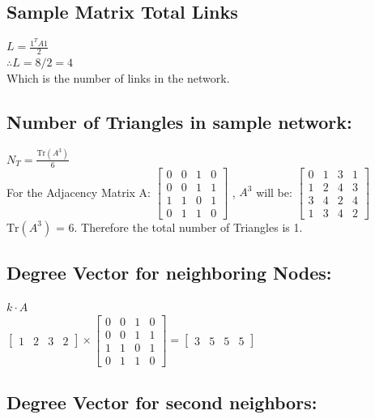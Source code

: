 \documentclass[11pt]{article}
\begin{document}
\subsection{Sample Matrix Total Links}
$L = \frac{1^T A 1}{2}$ 
\\
$\therefore L = 8/2 = 4$
\\
Which is the number of links in the network.

\subsection{Number of Triangles in sample network:}

$N_T = \frac{\text{Tr}(A^3)}{6}$
\\
For the Adjacency Matrix A: $ \begin{bmatrix}
    0 & 0 & 1 & 0 \\
    0 & 0 & 1 & 1 \\
    1 & 1 & 0 & 1 \\
    0 & 1 & 1 & 0

\end{bmatrix}$ , $A^3$ will be: $ \begin{bmatrix}
    0 & 1 & 3 & 1 \\
    1 & 2 & 4 & 3 \\
    3 & 4 & 2 & 4 \\
    1 & 3 & 4 & 2
\end{bmatrix}$ \\
$\text{Tr}(A^3)$ = 6.
Therefore the total number of Triangles is 1.

\subsection{Degree Vector for neighboring Nodes:}
$k \cdot A$ \\
$ \begin{bmatrix}
    1 & 2 & 3 & 2
\end{bmatrix}
\times
\begin{bmatrix}
    0 & 0 & 1 & 0 \\
    0 & 0 & 1 & 1 \\
    1 & 1 & 0 & 1 \\
    0 & 1 & 1 & 0
\end{bmatrix}
=
\begin{bmatrix}
    3 & 5 & 5 & 5
\end{bmatrix}
$

\subsection[short]{Degree Vector for second neighbors:}
\end{document}

